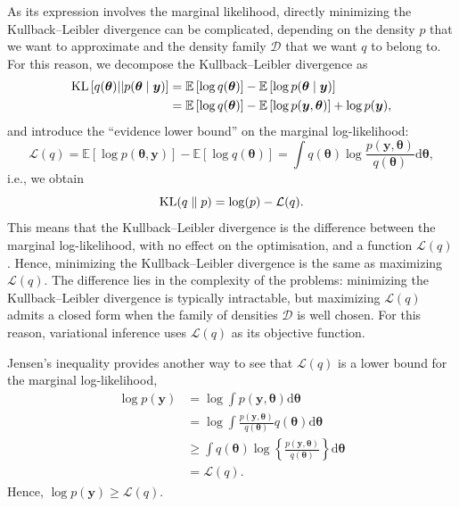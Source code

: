 \documentclass[a4paper, 11pt]{report}
\numberwithin{equation}{chapter}
\DeclareMathOperator*{\KL}{{\rm KL}}
\begin{document}
As its expression involves the marginal likelihood, directly minimizing the Kullback--Leibler divergence can be complicated, depending on the density $p$ that we want to approximate and the density family $\mathcal{D}$ that we want $q$ to belong to. For this reason, we decompose the Kullback--Leibler divergence as
\begin{align*}
\KL\left[q(\boldsymbol{\theta})||p(\boldsymbol{\theta}\mid \boldsymbol{y})\right] &= \mathbb{E}\left[\log q(\boldsymbol{\theta})\right] - \mathbb{E}\left[\log p(\boldsymbol{\theta}\mid \boldsymbol{y})\right]\\
&= \mathbb{E}\left[\log q(\boldsymbol{\theta})\right] - \mathbb{E}\left[\log p(\boldsymbol{y},\boldsymbol{\theta})\right] + \log p(\boldsymbol{y}),
\end{align*}
and introduce the ``evidence lower bound'' on the marginal log-likelihood:
\begin{equation*}
\mathcal{L}(q) = \mathbb{E}\left[\log p(\boldsymbol{\theta},\boldsymbol{y})\right] - \mathbb{E}\left[\log q(\boldsymbol{\theta})\right] =\int q(\boldsymbol{\theta})\log\frac{p(\boldsymbol{y},\boldsymbol{\theta})}{q(\boldsymbol{\theta})}\mathrm{d}\boldsymbol{\theta},
\end{equation*}
i.e., we obtain
\begin{equation*}
\KL(q\parallel p) = \log(p) - \mathcal{L}(q).
\end{equation*}
This means that the Kullback--Leibler divergence is the difference between the marginal log-likelihood, with no effect on the optimisation, and a function $\mathcal{L}(q)$. Hence, minimizing the Kullback--Leibler divergence is the same as maximizing $\mathcal{L}(q)$. The difference lies in the complexity of the problems: minimizing the Kullback--Leibler divergence is typically intractable, but maximizing $\mathcal{L}(q)$ admits a closed form when the family of densities $\mathcal{D}$ is well chosen. For this reason, variational inference uses $\mathcal{L}(q)$ as its objective function.

Jensen's inequality provides another way to see that $\mathcal{L}(q)$ is a lower bound for the marginal log-likelihood,
\begin{align*}
\log p(\boldsymbol{y}) &= \log \int p(\boldsymbol{y}, \boldsymbol{\theta}) \mathrm{d}\boldsymbol{\theta}\\
&= \log \int \frac{p(\boldsymbol{y}, \boldsymbol{\theta})}{q(\boldsymbol{\theta})}q(\boldsymbol{\theta})\mathrm{d}\boldsymbol{\theta}
\\
&\geq \int q(\boldsymbol{\theta}) \log \left\lbrace \frac{p(\boldsymbol{y}, \boldsymbol{\theta})}{q(\boldsymbol{\theta})} \right\rbrace \mathrm{d}\boldsymbol{\theta}\\
&= \mathcal{L}(q).
\end{align*}
Hence, $\log p(\boldsymbol{y}) \geq \mathcal{L}(q)$.
\end{document}
